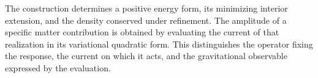 The construction determines a positive energy form, its minimizing
interior extension, and the density conserved under refinement.
The amplitude of a specific matter contribution is obtained by evaluating
the current of that realization in its variational quadratic form.
This distinguishes the operator fixing the response, the current
on which it acts, and the gravitational observable expressed by the evaluation.
